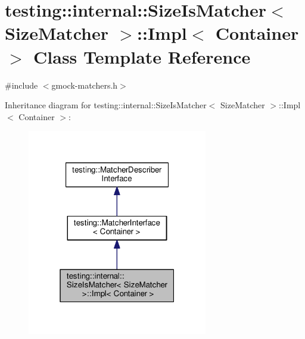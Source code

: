 \hypertarget{classtesting_1_1internal_1_1SizeIsMatcher_1_1Impl}{}\section{testing\+:\+:internal\+:\+:Size\+Is\+Matcher$<$ Size\+Matcher $>$\+:\+:Impl$<$ Container $>$ Class Template Reference}
\label{classtesting_1_1internal_1_1SizeIsMatcher_1_1Impl}


{\ttfamily \#include $<$gmock-\/matchers.\+h$>$}



Inheritance diagram for testing\+:\+:internal\+:\+:Size\+Is\+Matcher$<$ Size\+Matcher $>$\+:\+:Impl$<$ Container $>$\+:\nopagebreak
\begin{figure}[H]
\begin{center}
\leavevmode
\includegraphics[width=223pt]{classtesting_1_1internal_1_1SizeIsMatcher_1_1Impl__inherit__graph}
\end{center}
\end{figure}


